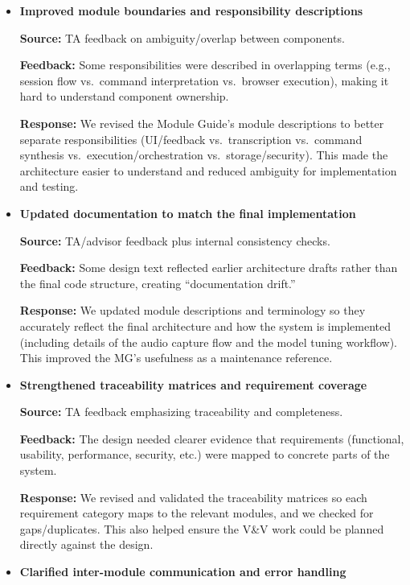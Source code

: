\documentclass{article}
\begin{document}
\begin{itemize}

\item \textbf{Improved module boundaries and responsibility descriptions}

\textbf{Source:} TA feedback on ambiguity/overlap between components.

\textbf{Feedback:} Some responsibilities were described in overlapping terms
(e.g., session flow vs.\ command interpretation vs.\ browser execution), making
it hard to understand component ownership.

\textbf{Response:} We revised the Module Guide's module descriptions to better
separate responsibilities (UI/feedback vs.\ transcription vs.\ command synthesis
vs.\ execution/orchestration vs.\ storage/security). This made the architecture
easier to understand and reduced ambiguity for implementation and testing.

\item \textbf{Updated documentation to match the final implementation}

\textbf{Source:} TA/advisor feedback plus internal consistency checks.

\textbf{Feedback:} Some design text reflected earlier architecture drafts rather
than the final code structure, creating ``documentation drift.''

\textbf{Response:} We updated module descriptions and terminology so they
accurately reflect the final architecture and how the system is implemented
(including details of the audio capture flow and the model tuning workflow).
This improved the MG's usefulness as a maintenance reference.

\item \textbf{Strengthened traceability matrices and requirement coverage}

\textbf{Source:} TA feedback emphasizing traceability and completeness.

\textbf{Feedback:} The design needed clearer evidence that requirements
(functional, usability, performance, security, etc.) were mapped to concrete
parts of the system.

\textbf{Response:} We revised and validated the traceability matrices so each
requirement category maps to the relevant modules, and we checked for
gaps/duplicates. This also helped ensure the V\&V work could be planned directly
against the design.

\item \textbf{Clarified inter-module communication and error handling}


\end{itemize}
\end{document}
